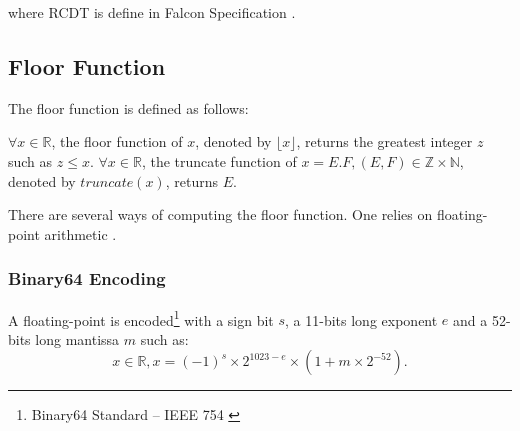 \documentclass[runningheads]{llncs}
\begin{document}
\noindent where RCDT is define in Falcon Specification \cite{prest2020falcon}.

\subsection{Floor Function}\label{subsec:floorfunction}
The floor function is defined as follows:
\begin{definition}\label{def:floorfunction}
  $\forall x \in \mathbb{R}$, the floor function of $x$, denoted by $\lfloor x \rfloor$, returns the greatest integer $z$ such as $z\leq x$.\newline
  $\forall x \in \mathbb{R}$, the truncate function of $x=E.F,(E,F)\in\mathbb{Z}\times\mathbb{N}$, denoted by $truncate(x)$, returns $E$.
\end{definition}
There are several ways of computing the floor function. One
relies on floating-point arithmetic \cite{kahan1996ieee}.
\subsubsection{Binary64 Encoding}
A floating-point is encoded\footnote{Binary64 Standard -- IEEE 754 \cite{kahan1996ieee}} with a sign bit $s$, a 11-bits long exponent $e$ and a 52-bits long mantissa $m$ such as:
\begin{equation}\label{eq:ieee754}
  x\in \mathbb{R}, x = (-1)^s \times 2^{1023-e} \times (1+ m\times2^{-52}).
\end{equation}
\end{document}
